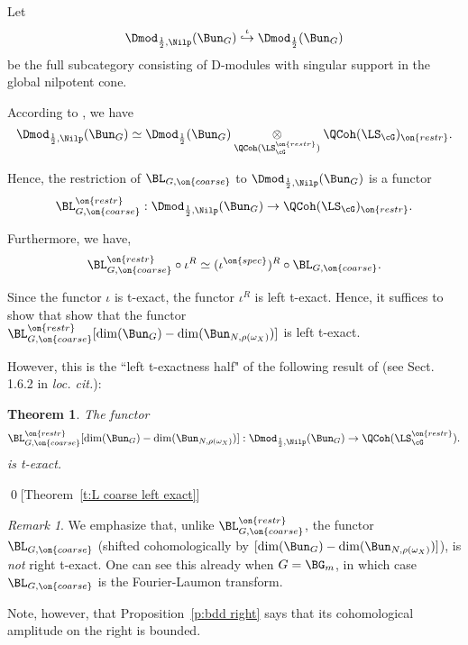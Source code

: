 \documentclass[9pt]{amsart}
\newtheorem{thm}[subsubsection]{Theorem}
\theoremstyle{remark}
\newtheorem{rem}[subsubsection]{Remark}
\theoremstyle{definition}
\theoremstyle{remark}
\newcommand{\thmref}[1]{Theorem~\ref{#1}}
\newcommand{\propref}[1]{Proposition~\ref{#1}}
\numberwithin{equation}{section}
\begin{document}
\sssec{} \label{sss:red to Nilp}

Let 
$$\Dmod_{\frac{1}{2},\Nilp}(\Bun_G) \overset{\iota}\hookrightarrow \Dmod_{\frac{1}{2}}(\Bun_G)$$
be the full subcategory consisting of D-modules with singular support in the global nilpotent cone.

\medskip

According to \cite[Proposition 14.5.3]{AGKRRV}, we have
\begin{equation} \label{e:Dmod nilp as ten}
\Dmod_{\frac{1}{2},\Nilp}(\Bun_G) \simeq \Dmod_{\frac{1}{2}}(\Bun_G)\underset{\QCoh(\LS^{\on{restr}}_\cG)}\otimes 
\QCoh(\LS_\cG)_{\on{restr}}.
\end{equation} 

Hence, the restriction of $\BL_{G,\on{coarse}}$ to $\Dmod_{\frac{1}{2},\Nilp}(\Bun_G)$ is a functor
$$\BL^{\on{restr}}_{G,\on{coarse}}: \Dmod_{\frac{1}{2},\Nilp}(\Bun_G) \to \QCoh(\LS_\cG)_{\on{restr}}.$$

Furthermore, we have,
$$\BL^{\on{restr}}_{G,\on{coarse}}\circ \iota^R\simeq (\iota^{\on{spec}})^R\circ \BL_{G,\on{coarse}}.$$

Since the functor $\iota$ is t-exact, the functor $\iota^R$ is left t-exact. Hence, it suffices to show that 
show that the functor $\BL^{\on{restr}}_{G,\on{coarse}}[\dim(\Bun_G)-\dim(\Bun_{N,\rho(\omega_X)})]$ is left t-exact. 

\medskip

However, this is the ``left t-exactness half" of the following result of \cite{FR} (see Sect. 1.6.2 in {\it loc. cit.}): 

\begin{thm} \label{t:L coarse left exact Nilp}
The functor
$$\BL^{\on{restr}}_{G,\on{coarse}}[\dim(\Bun_G)-\dim(\Bun_{N,\rho(\omega_X)})]:\Dmod_{\frac{1}{2},\Nilp}(\Bun_G) \to
\QCoh(\LS^{\on{restr}}_\cG).$$
is t-exact. 
\end{thm} 

\qed[\thmref{t:L coarse left exact}]

\begin{rem} \label{r:right ampl}
We emphasize that, unlike $\BL^{\on{restr}}_{G,\on{coarse}}$, the functor $\BL_{G,\on{coarse}}$ (shifted cohomologically by 
$[\dim(\Bun_G)-\dim(\Bun_{N,\rho(\omega_X)})]$), is \emph{not} right t-exact. One can see
this already when $G=\BG_m$, in which case $\BL_{G,\on{coarse}}$ is the Fourier-Laumon transform.

\medskip

Note, however, that \propref{p:bdd right} says that its cohomological amplitude on the right 
is bounded. 

\end{rem}
\end{document}
